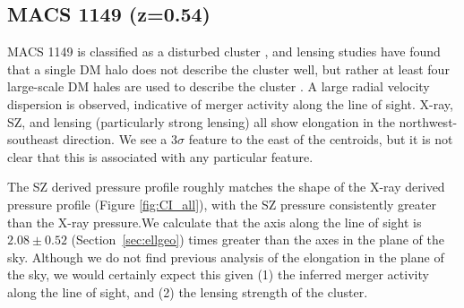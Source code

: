 \documentclass[iop,numberedappendix,apj]{emulateapj}
\begin{document}


\subsection{MACS 1149 (z=0.54)}
\label{sec:results_m1149}


MACS 1149 is classified as a disturbed cluster \citep[e.g.][]{mann2012,sayers2013}, and lensing studies have found
that a single DM halo does not describe the cluster well, but rather at least four large-scale DM hales are used to
describe the cluster \citep{smith2009}. A large radial velocity dispersion \citep[1800 km s$^{-1}$][]{ebeling2007} is 
observed, indicative of merger activity along the line of sight. X-ray, SZ, and lensing (particularly 
strong lensing) all show elongation in the northwest-southeast direction. We see a $3\sigma$ feature to the east of
the centroids, but it is not clear that this is associated with any particular feature.

The SZ derived pressure profile roughly matches the shape of the X-ray derived pressure profile (Figure
\ref{fig:CI_all}), with the SZ pressure consistently greater than the X-ray pressure.We calculate
that the axis along the line of sight is $2.08 \pm 0.52$ (Section~\ref{sec:ellgeo}) times greater than the axes in the plane
of the sky. Although we do not find previous analysis of the elongation in the plane of the sky, we would certainly
expect this given (1) the inferred merger activity along the line of sight, and (2) the lensing strength of the cluster.

\end{document}
